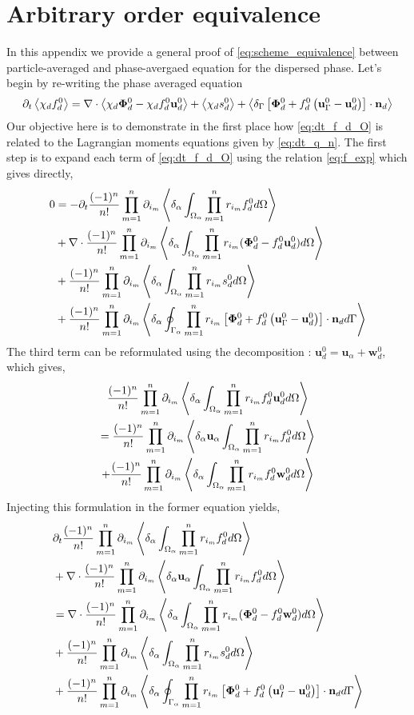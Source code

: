 \section{Arbitrary order equivalence}
\label{sec:demo}
In this appendix we provide a general proof of \ref{eq:scheme_equivalence} between particle-averaged and phase-avergaed equation for the dispersed phase. 
Let's begin by re-writing the phase averaged equation
\begin{equation}
        \pddt \avg{\chi_d f_d^0}
        = \div \avg{\chi_d \bm\Phi_d^0 - \chi_d f_d^0 \textbf{u}_d^0}
        + \avg{\chi_d s_d^0}
        + \avg{\delta_\Gamma\left[
            \bm\Phi_d^0
            + f_d^0
            \left(
                \textbf{u}_\Gamma^0
                - \textbf{u}_d^0
            \right)
        \right]
        \cdot \textbf{n}_d} 
        \label{eq:dt_f_d_O}
\end{equation}
Our objective here is to demonstrate in the first place how \ref{eq:dt_f_d_O} is related to the Lagrangian moments equations given by \ref{eq:dt_q_n}. 
The first step is to expand each term of \ref{eq:dt_f_d_O} using the relation \ref{eq:f_exp} which gives directly,
\begin{align*}
        0 &=
        - \partial_t \frac{(-1)^n}{n!} \prod_{m=1}^{n} \partial_{i_m} \left<\delta_\alpha \int_{\Omega_{\alpha}}  \prod_{m=1}^{n} r_{i_m}f_d^0  d\Omega\right> \\
        &+\mathbf{\nabla}\cdot \frac{(-1)^n}{n!} \prod_{m=1}^{n} \partial_{i_m} \left<\delta_\alpha \int_{\Omega_{\alpha}}  \prod_{m=1}^{n} r_{i_m}(\bm\Phi_d^0  - f_d^0 \textbf{u}_d^0)  d\Omega\right>\\
        &+ \frac{(-1)^n}{n!} \prod_{m=1}^{n} \partial_{i_m} \left<\delta_\alpha \int_{\Omega_{\alpha}}  \prod_{m=1}^{n} r_{i_m} s_d^0  d\Omega\right>\\
        &+ \frac{(-1)^n}{n!} \prod_{m=1}^{n} \partial_{i_m} \left<\delta_\alpha \oint_{\Gamma_{\alpha}} \prod_{m=1}^{n} r_{i_m}\left[
            \bm\Phi_d^0
            + f_d^0
            \left(
                \textbf{u}_\Gamma^0
                - \textbf{u}_d^0
            \right)
        \right]
        \cdot \textbf{n}_d  d\Gamma\right> \\
\end{align*}
The third term can be reformulated using the decomposition : $\textbf{u}_d^0 = \textbf{u}_\alpha + \textbf{w}_d^0$, which gives,
\begin{multline}
    \frac{(-1)^n}{n!} \prod_{m=1}^{n} \partial_{i_m} \left<\delta_\alpha \int_{\Omega_{\alpha}}  \prod_{m=1}^{n} r_{i_m}f_d^0 \textbf{u}_d^0  d\Omega\right>\\
    =     \frac{(-1)^n}{n!} \prod_{m=1}^{n} \partial_{i_m} \left<\delta_\alpha \textbf{u}_\alpha\int_{\Omega_{\alpha}}  \prod_{m=1}^{n} r_{i_m}f_d^0   d\Omega\right>\\
    +     \frac{(-1)^n}{n!} \prod_{m=1}^{n} \partial_{i_m} \left<\delta_\alpha \int_{\Omega_{\alpha}}  \prod_{m=1}^{n} r_{i_m}f_d^0 \textbf{w}_d^0  d\Omega\right>
\end{multline}
Injecting this formulation in the former equation yields,
\begin{align}
    & \pddt \expo{f_d^0} \\
    &+ \div \expoU{f_d^0}\\
    &= \div \expo{(\bm\Phi_d^0 - f_d^0 \textbf{w}_d^0)}\\
    &+ \expo{ s_d^0}\\
    &+ \expoS{\left[
        \bm\Phi_d^0
        + f_d^0 
        \left(
            \textbf{u}_I^0
            - \textbf{u}_d^0
        \right)
    \right]
    \cdot \textbf{n}_d} \\
    \label{eq:nearly_done}
\end{align}
